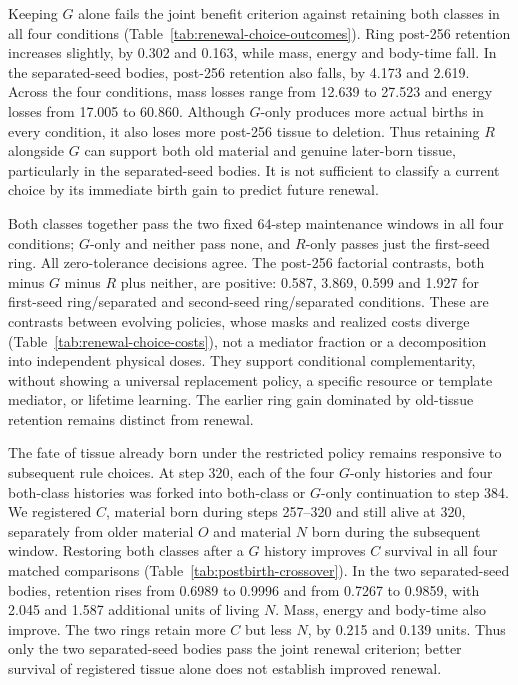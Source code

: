 Keeping $G$ alone fails the joint benefit criterion against retaining both classes in all four conditions (Table~\ref{tab:renewal-choice-outcomes}). Ring post-256 retention increases slightly, by 0.302 and 0.163, while mass, energy and body-time fall. In the separated-seed bodies, post-256 retention also falls, by 4.173 and 2.619. Across the four conditions, mass losses range from 12.639 to 27.523 and energy losses from 17.005 to 60.860. Although $G$-only produces more actual births in every condition, it also loses more post-256 tissue to deletion. Thus retaining $R$ alongside $G$ can support both old material and genuine later-born tissue, particularly in the separated-seed bodies. It is not sufficient to classify a current choice by its immediate birth gain to predict future renewal.

Both classes together pass the two fixed 64-step maintenance windows in all four conditions; $G$-only and neither pass none, and $R$-only passes just the first-seed ring. All zero-tolerance decisions agree. The post-256 factorial contrasts, both minus $G$ minus $R$ plus neither, are positive: 0.587, 3.869, 0.599 and 1.927 for first-seed ring/separated and second-seed ring/separated conditions. These are contrasts between evolving policies, whose masks and realized costs diverge (Table~\ref{tab:renewal-choice-costs}), not a mediator fraction or a decomposition into independent physical doses. They support conditional complementarity, without showing a universal replacement policy, a specific resource or template mediator, or lifetime learning. The earlier ring gain dominated by old-tissue retention remains distinct from renewal.



The fate of tissue already born under the restricted policy remains responsive to subsequent rule choices. At step 320, each of the four $G$-only histories and four both-class histories was forked into both-class or $G$-only continuation to step 384. We registered $C$, material born during steps 257--320 and still alive at 320, separately from older material $O$ and material $N$ born during the subsequent window. Restoring both classes after a $G$ history improves $C$ survival in all four matched comparisons (Table~\ref{tab:postbirth-crossover}). In the two separated-seed bodies, retention rises from 0.6989 to 0.9996 and from 0.7267 to 0.9859, with 2.045 and 1.587 additional units of living $N$. Mass, energy and body-time also improve. The two rings retain more $C$ but less $N$, by 0.215 and 0.139 units. Thus only the two separated-seed bodies pass the joint renewal criterion; better survival of registered tissue alone does not establish improved renewal.

